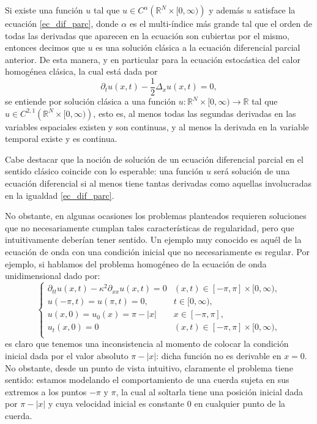 \documentclass[letterpaper,twoside]{book}
\newcommand{\R}{\mathbb{R}}
\newcommand{\1}{\mathds{1}}
\newcommand{\abs}[1]{\left\lvert #1 \right\rvert}
\renewcommand{\to}{\rightarrow}
\theoremstyle{definition}
\theoremstyle{definition}
\theoremstyle{definition}
\theoremstyle{definition}
\theoremstyle{definition}
\theoremstyle{definition}
\theoremstyle{definition}
\begin{document}
Si existe una función $u$ tal que $u\in C^{\alpha}\left(\R^{N}\times [0,\infty)\right)$ y además $u$ satisface la ecuación \eqref{ec_dif_parc}, donde $\alpha$ es el multi-índice más grande tal que el orden de todas las derivadas que aparecen en la ecuación son cubiertas por el mismo, entonces decimos que $u$ es una solución clásica a la ecuación diferencial parcial anterior. De esta manera, y en particular para la ecuación estocástica del calor homogénea clásica, la cual está dada por 
\[
    \partial_tu(x,t)-\frac{1}{2}\Delta_x u(x,t)=0,
\]
se entiende por solución clásica a una función $u:\R^{N}\times[0,\infty)\to \R$ tal que $u\in C^{2,1}\left(\R^{N}\times [0,\infty)\right)$, esto es, al menos todas las segundas derivadas en las variables espaciales existen y son continuas, y al menos la derivada en la variable temporal existe y es continua. 

Cabe destacar que la noción de solución de un ecuación diferencial parcial en el sentido clásico coincide con lo esperable: una función $u$ será solución de una ecuación diferencial si al menos tiene tantas derivadas como aquellas involucradas en la igualdad \eqref{ec_dif_parc}.

No obstante, en algunas ocasiones los problemas planteados requieren soluciones que no necesariamente cumplan tales características de regularidad, pero que intuitivamente deberían tener sentido.
 Un ejemplo muy conocido es aquél de la ecuación de onda con una condición inicial que no necesariamente es regular. Por ejemplo, si hablamos del problema homogéneo de la ecuación de onda unidimensional dado por:
\begin{equation}\label{wave_eq_sobolev}
    \begin{cases}
        \partial_{tt}u(x,t)-\kappa^2\partial_{xx}u(x,t)=0 & (x,t)\in [-\pi,\pi]\times[0,\infty),\\
        u(-\pi,t)=u(\pi,t)=0, & t\in [0,\infty),\\
        u(x,0)=u_0(x)=\pi-\abs{x} & x\in [-\pi,\pi],\\
        u_t(x,0)=0 & (x,t) \in [-\pi,\pi]\times[0,\infty),\\
    \end{cases}
\end{equation}
es claro que tenemos una inconsistencia al momento de colocar la condición inicial dada por el valor absoluto $\pi-|x|$: dicha función no es derivable en $x=0$. No obstante, desde un punto de vista intuitivo, claramente el problema tiene sentido: estamos modelando el comportamiento de una cuerda sujeta en sus extremos a los puntos $-\pi$ y $\pi$, la cual al soltarla tiene una posición inicial dada por $\pi-|x|$ y cuya velocidad inicial es constante $0$ en cualquier punto de la cuerda.\newline
\end{document}
